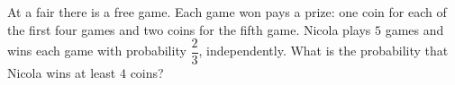 At a fair there is a free game. Each game won pays a prize: one coin for each of the first four games and two coins for the fifth game. Nicola plays $5$ games and wins each game with probability $\dfrac23$, independently. What is the probability that Nicola wins at least $4$ coins?
